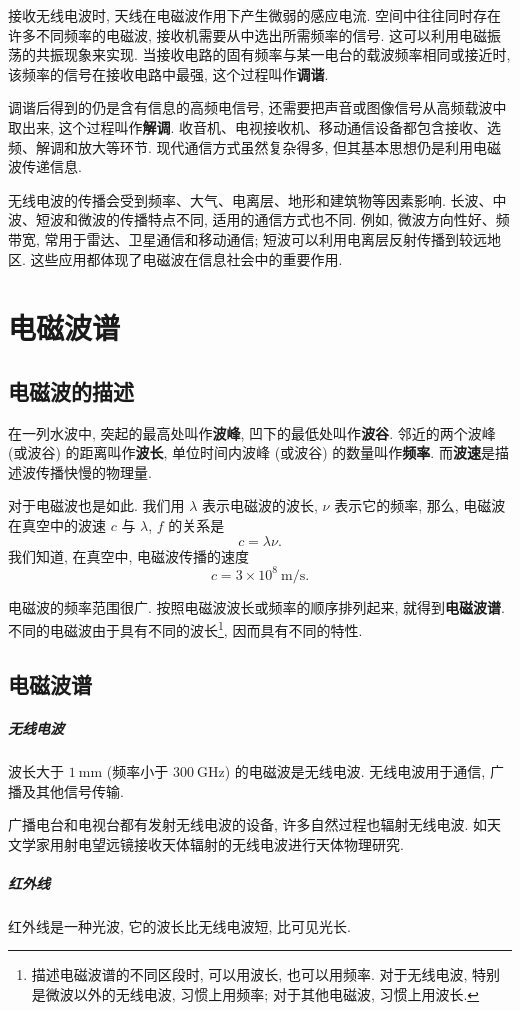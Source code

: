 \documentclass[UTF8,openany,fontset=fandol]{ctexbook}
\theoremstyle{chinesetextbook}
\newcommand{\unit}[1]{\ \mathrm{#1}}
\begin{document}
接收无线电波时, 天线在电磁波作用下产生微弱的感应电流. 空间中往往同时存在许多不同频率的电磁波, 接收机需要从中选出所需频率的信号. 这可以利用电磁振荡的共振现象来实现. 当接收电路的固有频率与某一电台的载波频率相同或接近时, 该频率的信号在接收电路中最强, 这个过程叫作\textbf{调谐}.

调谐后得到的仍是含有信息的高频电信号, 还需要把声音或图像信号从高频载波中取出来, 这个过程叫作\textbf{解调}. 收音机、电视接收机、移动通信设备都包含接收、选频、解调和放大等环节. 现代通信方式虽然复杂得多, 但其基本思想仍是利用电磁波传递信息.

无线电波的传播会受到频率、大气、电离层、地形和建筑物等因素影响. 长波、中波、短波和微波的传播特点不同, 适用的通信方式也不同. 例如, 微波方向性好、频带宽, 常用于雷达、卫星通信和移动通信; 短波可以利用电离层反射传播到较远地区. 这些应用都体现了电磁波在信息社会中的重要作用.
\section{电磁波谱}\label{sec:电磁波谱}
\subsection{电磁波的描述}
在一列水波中, 突起的最高处叫作\textbf{波峰}, 凹下的最低处叫作\textbf{波谷}. 邻近的两个波峰 (或波谷) 的距离叫作\textbf{波长}, 单位时间内波峰 (或波谷) 的数量叫作\textbf{频率}. 而\textbf{波速}是描述波传播快慢的物理量.

对于电磁波也是如此. 我们用 $\lambda$ 表示电磁波的波长, $\nu$ 表示它的频率, 那么, 电磁波在真空中的波速 $c$ 与 $\lambda$, $f$ 的关系是
\[
c=\lambda\nu.
\]
我们知道, 在真空中, 电磁波传播的速度
\[
c=3\times 10^8\unit{m/s}.
\]

电磁波的频率范围很广. 按照电磁波波长或频率的顺序排列起来, 就得到\textbf{电磁波谱}. 不同的电磁波由于具有不同的波长\footnote{描述电磁波谱的不同区段时, 可以用波长, 也可以用频率. 对于无线电波, 特别是微波以外的无线电波, 习惯上用频率; 对于其他电磁波, 习惯上用波长.}, 因而具有不同的特性.
\subsection{电磁波谱}
\subparagraph{无线电波} 波长大于 $1\unit{mm}$ (频率小于 $300\unit{GHz}$) 的电磁波是无线电波. 无线电波用于通信, 广播及其他信号传输.

广播电台和电视台都有发射无线电波的设备, 许多自然过程也辐射无线电波. 如天文学家用射电望远镜接收天体辐射的无线电波进行天体物理研究.

\subparagraph{红外线} 红外线是一种光波, 它的波长比无线电波短, 比可见光长.
\end{document}
